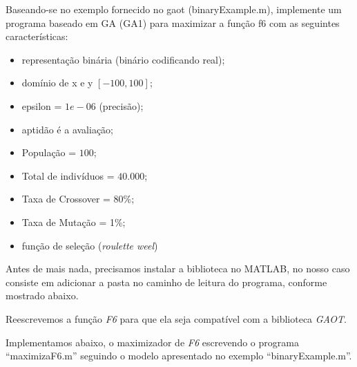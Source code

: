 \documentclass{article}
\begin{document}
\begin{flushleft}
	Baseando-se no exemplo fornecido no gaot (binaryExample.m),
	implemente um programa baseado em GA (GA1) para maximizar a
	função f6 com as seguintes características:

	\begin{itemize}
		\item representação binária (binário codificando real);
		\item domínio de x e y $[-100, 100]$;
		\item epsilon = $1e-06$ (precisão);
		\item aptidão é a avaliação;
		\item População = $100$;
		\item Total de indivíduos = $40.000$;
		\item Taxa de Crossover = 80\%;
		\item Taxa de Mutação = 1\%;
		\item função de seleção (\emph{roulette weel})
	\end{itemize}

	Antes de mais nada, precisamos instalar a biblioteca no
	MATLAB\cite{MATLAB:2020b}, no nosso caso consiste em
	adicionar a pasta no caminho de leitura do programa,
	conforme mostrado abaixo.
\end{flushleft}



\begin{flushleft}
	Reescrevemos a função \emph{F6} para que ela seja compatível
	com a biblioteca \emph{GAOT}.
\end{flushleft}



\begin{flushleft}
	Implementamos abaixo, o maximizador de \emph{F6} escrevendo
	o programa ``maximizaF6.m'' seguindo o modelo apresentado no
	exemplo ``binaryExample.m''.
\end{flushleft}





\end{document}
